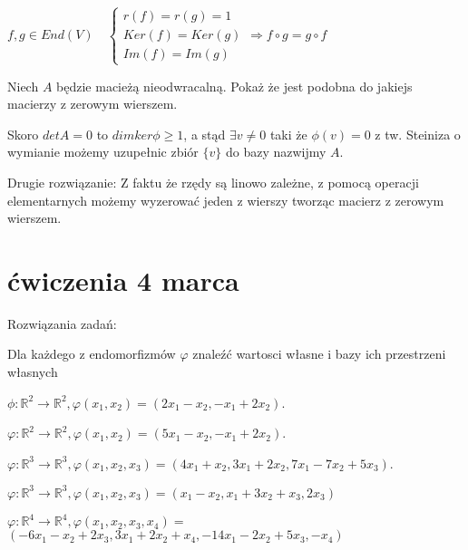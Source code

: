 \documentclass[11pt]{scrartcl}
\begin{document}
      \begin{zadanie}
          $f,g \in End(V) \quad 
          \begin{cases}
              r(f) = r(g) = 1 \\
              Ker(f) = Ker(g) \\
              Im(f) = Im(g)
          \end{cases}
          \Rightarrow f \circ g = g \circ f $
      \end{zadanie}

      \begin{zadanie}
          Niech $A$ będzie macieżą nieodwracalną. Pokaż że jest podobna do jakiejs macierzy z zerowym wierszem.
      \end{zadanie}
      
      Skoro $ det A = 0 $ to $ dim ker \phi \geq 1 $, a stąd $ \exists v \not = 0 $ taki że $ \phi (v) = 0$ z tw. Steiniza o wymianie możemy uzupełnic zbiór $\{ v \}$ do bazy nazwijmy $A$.

      Drugie rozwiązanie:
      Z faktu że rzędy są linowo zależne, z pomocą operacji elementarnych możemy wyzerować jeden z wierszy tworząc macierz z zerowym wierszem.

  \section{ćwiczenia 4 marca}
    Rozwiązania zadań:

    \begin{zadanie}
        Dla każdego z endomorfizmów $\varphi$ znaleźć wartosci własne i bazy ich przestrzeni własnych
        \begin{walk}
            \item $\phi : \mathbb{R}^2 \to \mathbb{R}^2, \varphi \left ( x_{1}, x_{2} \right ) = \left ( 2 x_{1} - x_{2}, -x_{1} + 2x_{2} \right )$.
            \item $\varphi : \mathbb{R}^2 \to \mathbb{R}^2, \varphi \left ( x_{1}, x_{2} \right ) = \left ( 5x_{1} - x_{2}, -x_{1} + 2x_{2} \right )$.
            \item $\varphi : \mathbb{R}^3 \to \mathbb{R}^3 , \varphi \left ( x_{1}, x_{2}, x_{3} \right ) = \left ( 4x_{1} + x_{2}, 3x_{1} + 2x_{2}, 7x_{1} - 7x_{2} + 5x_{3} \right )$.
            \item $\varphi : \mathbb{R}^3 \to \mathbb{R}^3, \varphi \left ( x_{1}, x_{2}, x_{3} \right ) = \left ( x_{1} - x_{2}, x_{1} + 3x_{2} + x_{3}, 2x_{3} \right )$ 
            \item $\varphi : \mathbb{R}^4 \to \mathbb{R}^4, \varphi \left ( x_{1}, x_{2}, x_{3}, x_{4} \right )= $ \\
              $\left ( -6x_{1} - x_{2} + 2x_{3}, 3x_{1} + 2x_{2} + x_{4}, -14x_{1} - 2x_{2} + 5x_{3}, -x_{4} \right )$
        \end{walk}
    \end{zadanie}
\end{document}
